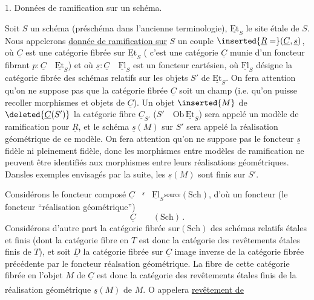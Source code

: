 1. Données de ramification sur un schéma.

Soit $S$ un schéma (préschéma dans l'ancienne terminologie), $\underline{\mathrm{Et}}_S$ le site étale de $S$. Nous appelerons \uline{donnée de ramification sur} $S$  un couple $\inserted{\underline{R}=}(\underline{C},\underline{s})$, où $\underline{C}$ est une catégorie fibrée sur $\underline{\mathrm{Et}}_S$ ( c'est une catégorie $\underline{C}$ munie d'un foncteur fibrant $p:\underline{C}\quad\underline{\mathrm{Et}}_S$) et où $\underline{s}:\underline{C}\quad\underline{\mathrm{Fl}}_S$ est un foncteur cartésien, où $\underline{\mathrm{Fl}}_S$ désigne la catégorie fibrée des  schémas relatifs sur les objets $S'$ de $\underline{\mathrm{Et}}_S$. On fera attention qu'on ne suppose pas que la catégorie fibrée $\underline{C}$ soit un champ (i.e. qu'on puisse recoller morphismes et objets de $\underline{C}$). Un objet $\inserted{M}$ de $\deleted{\underline{C}(S')}$ la catégorie fibre $\underline{C}_{S'}$ ($S'\quad\mathrm{Ob}\,\underline{\mathrm{Et}}_S$) sera appelé un modèle de ramification pour $\underline{R}$, et le schéma $\underline{s}(M)$ sur $S'$ sera appelé la réalisation géométrique de ce modèle. On fera attention qu'on ne suppose pas le foncteur $\underline{s}$ fidèle ni pleinement fidèle, donc les morphismes entre modèles de ramification ne peuvent être identifiés aux morphismes entre leurs réalisations géométriques. Dansles exemples envisagés par la suite, les $\underline{s}(M)$ sont finis sur $S'$.

Considérons le foncteur composé $\underline{C}\overset{\underline{s}}{\qquad}\underline{\mathrm{Fl}}_S\overset{\mathrm{source}}{\qquad}(\mathrm{Sch})$, d'où un foncteur (le foncteur ``réalisation géométrique'')
\[
\underline{C}\qquad(\mathrm{Sch})\,.
\]
Considérons d'autre part la catégorie fibrée sur$(\mathrm{Sch})$ des schémas relatifs étales et finis (dont la catégorie fibre en $T$ est donc la catégorie des revêtements étales finis de $T$), et soit $\underline{D}$ la catégorie fibrée sur $\underline{C}$ image inverse de la catégorie fibrée précédente par le foncteur réalsation géométrique. La fibre de cette catégorie fibrée en l'objet $M$ de $\underline{C}$ est donc la catégorie des revêtements étales finis de la réalisation géométrique $\underline{s}(M)$ de $M$. O\textsuperscript{} appelera \uline{revêtement de} 
